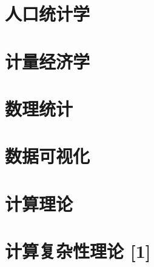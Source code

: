 \section{人口统计学}
\section{计量经济学}
\section{数理统计}
\section{数据可视化}
\section{计算理论}
\section{计算复杂性理论 [1] }

